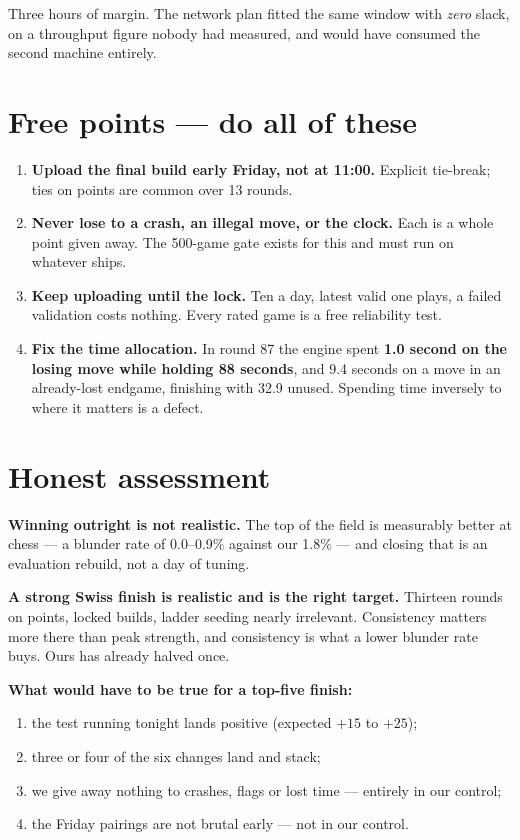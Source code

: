 \documentclass[11pt,a4paper]{article}
\begin{document}
Three hours of margin. The network plan fitted the same window with \emph{zero} slack, on a
throughput figure nobody had measured, and would have consumed the second machine entirely.

\section{Free points --- do all of these}

\begin{enumerate}[leftmargin=1.4em]
\item \textbf{Upload the final build early Friday, not at 11:00.} Explicit tie-break; ties on
      points are common over 13 rounds.
\item \textbf{Never lose to a crash, an illegal move, or the clock.} Each is a whole point given
      away. The 500-game gate exists for this and must run on whatever ships.
\item \textbf{Keep uploading until the lock.} Ten a day, latest valid one plays, a failed
      validation costs nothing. Every rated game is a free reliability test.
\item \textbf{Fix the time allocation.} In round 87 the engine spent \textbf{1.0 second on the
      losing move while holding 88 seconds}, and 9.4 seconds on a move in an already-lost endgame,
      finishing with 32.9 unused. Spending time inversely to where it matters is a defect.
\end{enumerate}

\section{Honest assessment}

\textbf{Winning outright is not realistic.} The top of the field is measurably better at chess ---
a blunder rate of 0.0--0.9\% against our 1.8\% --- and closing that is an evaluation rebuild, not a
day of tuning.

\textbf{A strong Swiss finish is realistic and is the right target.} Thirteen rounds on points,
locked builds, ladder seeding nearly irrelevant. Consistency matters more there than peak
strength, and consistency is what a lower blunder rate buys. Ours has already halved once.

\textbf{What would have to be true for a top-five finish:}
\begin{enumerate}[leftmargin=1.4em]
\item the test running tonight lands positive (expected $+15$ to $+25$);
\item three or four of the six changes land and stack;
\item we give away nothing to crashes, flags or lost time --- entirely in our control;
\item the Friday pairings are not brutal early --- not in our control.
\end{enumerate}
\end{document}
